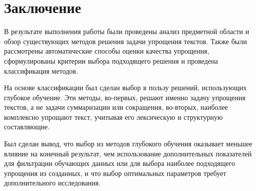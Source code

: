 \chapter*{Заключение}

В результате выполнения работы были проведены анализ предметной области и обзор существующих методов решения задачи упрощения текстов. Также были рассмотрены автоматические способы оценки качества упрощения, сформулированы критерии выбора подходящего решения и проведена классификация методов.

На основе классификации был сделан выбор в пользу решений, использующих глубокое обучение. Эти методы, во-первых, решают именно задачу упрощения текстов, а не задачи суммаризации или сокращения, во-вторых, наиболее комплексно упрощают текст, учитывая его лексическую и структурную составляющие.

Был сделан вывод, что выбор из методов глубокого обучения оказывает меньшее влияние на конечный результат, чем использование дополнительных показателей для фильтрации обучающих данных или для выбора наиболее подходящего упрощения из созданных, и что выбор оптимальных параметров требует дополнительного исследования.







